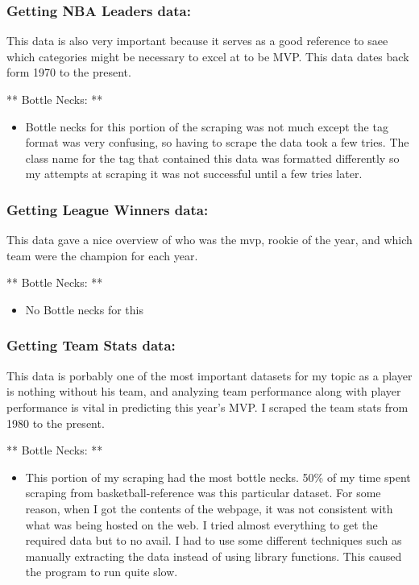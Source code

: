 \documentclass[11pt]{article}
\providecommand{\tightlist}{%
      \setlength{\itemsep}{0pt}\setlength{\parskip}{0pt}}
\begin{document}
    \subsubsection{Getting NBA Leaders
data:}\label{getting-nba-leaders-data}

This data is also very important because it serves as a good reference
to saee which categories might be necessary to excel at to be MVP. This
data dates back form 1970 to the present.

** Bottle Necks: **

\begin{itemize}
\tightlist
\item
  Bottle necks for this portion of the scraping was not much except the
  tag format was very confusing, so having to scrape the data took a few
  tries. The class name for the tag that contained this data was
  formatted differently so my attempts at scraping it was not successful
  until a few tries later.
\end{itemize}

    \subsubsection{Getting League Winners
data:}\label{getting-league-winners-data}

This data gave a nice overview of who was the mvp, rookie of the year,
and which team were the champion for each year.

** Bottle Necks: **

\begin{itemize}
\tightlist
\item
  No Bottle necks for this
\end{itemize}

    \subsubsection{Getting Team Stats data:}\label{getting-team-stats-data}

This data is porbably one of the most important datasets for my topic as
a player is nothing without his team, and analyzing team performance
along with player performance is vital in predicting this year's MVP. I
scraped the team stats from 1980 to the present.

** Bottle Necks: **

\begin{itemize}
\tightlist
\item
  This portion of my scraping had the most bottle necks. 50\% of my time
  spent scraping from basketball-reference was this particular dataset.
  For some reason, when I got the contents of the webpage, it was not
  consistent with what was being hosted on the web. I tried almost
  everything to get the required data but to no avail. I had to use some
  different techniques such as manually extracting the data instead of
  using library functions. This caused the program to run quite slow.
\end{itemize}
\end{document}
